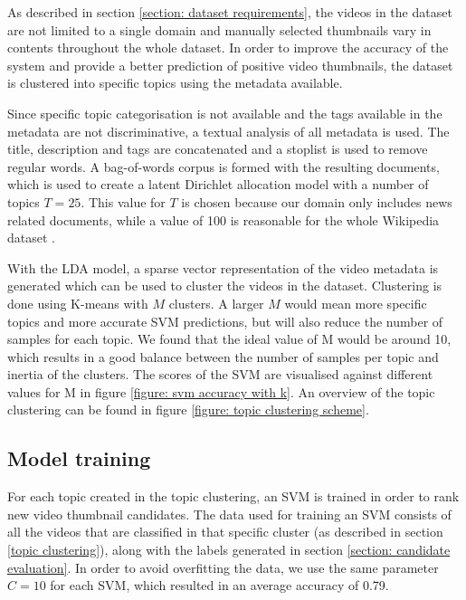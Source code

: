 \documentclass{../resources/sig-alternate-05-2015}
\begin{document}
As described in section \ref{section: dataset requirements}, the videos in the dataset are not limited to a single domain and manually selected thumbnails vary in contents throughout the whole dataset. In order to improve the accuracy of the system and provide a better prediction of positive video thumbnails, the dataset is clustered into specific topics using the metadata available.

Since specific topic categorisation is not available and the tags available in the metadata are not discriminative, a textual analysis of all metadata is used. The title, description and tags are concatenated and a stoplist is used to remove regular words. A bag-of-words corpus is formed with the resulting documents, which is used to create a latent Dirichlet allocation model with a number of topics $T = 25$. This value for $T$ is chosen because our domain only includes news related documents, while a value of 100 is reasonable for the whole Wikipedia dataset \cite{Newman:2009uk,Blei:2003tn}.

With the LDA model, a sparse vector representation of the video metadata is generated which can be used to cluster the videos in the dataset. Clustering is done using K-means with $M$ clusters. A larger $M$ would mean more specific topics and more accurate SVM predictions, but will also reduce the number of samples for each topic. We found that the ideal value of M would be around 10, which results in a good balance between the number of samples per topic and inertia of the clusters. The scores of the SVM are visualised against different values for M in figure \ref{figure: svm accuracy with k}. An overview of the topic clustering can be found in figure \ref{figure: topic clustering scheme}.

\subsection{Model training}
\label{section: model training}

For each topic created in the topic clustering, an SVM is trained in order to rank new video thumbnail candidates. The data used for training an SVM consists of all the videos that are classified in that specific cluster (as described in section \ref{topic clustering}), along with the labels generated in section \ref{section: candidate evaluation}. In order to avoid overfitting the data, we use the same parameter $C = 10$ for each SVM, which resulted in an average accuracy of 0.79.
\end{document}
